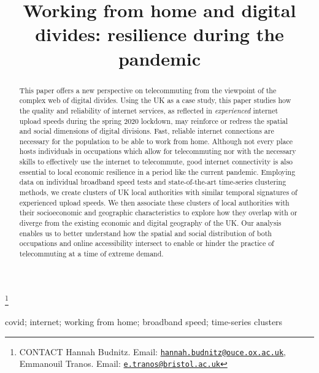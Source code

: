 \documentclass[]{interact}
\theoremstyle{plain}%
\theoremstyle{definition}
\theoremstyle{remark}
\begin{document}
\articletype{}

\title{Working from home and digital divides: resilience during the
pandemic}


\author{
}

\thanks{CONTACT Hannah
Budnitz. Email: \href{mailto:hannah.budnitz@ouce.ox.ac.uk}{\nolinkurl{hannah.budnitz@ouce.ox.ac.uk}}, Emmanouil
Tranos. Email: \href{mailto:e.tranos@bristol.ac.uk}{\nolinkurl{e.tranos@bristol.ac.uk}}}

\maketitle

\begin{abstract}
This paper offers a new perspective on telecommuting from the viewpoint
of the complex web of digital divides. Using the UK as a case study,
this paper studies how the quality and reliability of internet services,
as reflected in \emph{experienced} internet upload speeds during the
spring 2020 lockdown, may reinforce or redress the spatial and social
dimensions of digital divisions. Fast, reliable internet connections are
necessary for the population to be able to work from home. Although not
every place hosts individuals in occupations which allow for
telecommuting nor with the necessary skills to effectively use the
internet to telecommute, good internet connectivity is also essential to
local economic resilience in a period like the current pandemic.
Employing data on individual broadband speed tests and state-of-the-art
time-series clustering methods, we create clusters of UK local
authorities with similar temporal signatures of experienced upload
speeds. We then associate these clusters of local authorities with their
socioeconomic and geographic characteristics to explore how they overlap
with or diverge from the existing economic and digital geography of the
UK. Our analysis enables us to better understand how the spatial and
social distribution of both occupations and online accessibility
intersect to enable or hinder the practice of telecommuting at a time of
extreme demand.
\end{abstract}

\begin{keywords}
covid; internet; working from home; broadband speed; time-series
clusters
\end{keywords}
\end{document}

